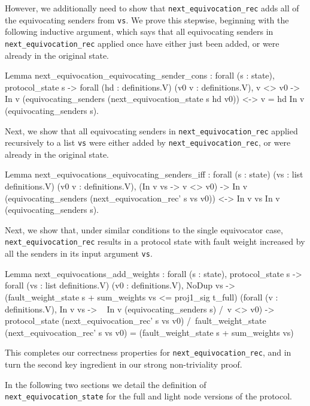 \documentclass[runningheads]{llncs}
\begin{document}
However, we additionally need to show that \verb|next_equivocation_rec| adds all of the equivocating senders from \verb|vs|. We prove this stepwise, beginning with the following inductive argument, which says that all equivocating senders in \verb|next_equivocation_rec| applied once have either just been added, or were already in the original state. 
\begin{coq}
Lemma next_equivocation_equivocating_sender_cons :
	forall (s : state),
	protocol_state s ->
	forall (hd : definitions.V) (v0 v : definitions.V),
	v <> v0 -> 
	In v (equivocating_senders (next_equivocation_state s hd v0)) <->
	v = hd \/ In v (equivocating_senders s).
\end{coq}
Next, we show that all equivocating senders in \verb|next_equivocation_rec| applied recursively to a list \verb|vs| were either added by \verb|next_equivocation_rec|, or were already in the original state. 
\begin{coq}
Lemma next_equivocations_equivocating_senders_iff :
	forall (s : state) (vs : list definitions.V) (v0 v : definitions.V),
	(In v vs -> v <> v0) ->
	In v (equivocating_senders (next_equivocation_rec' s vs v0)) <->
	In v vs \/ In v (equivocating_senders s). 
\end{coq}
Next, we show that, under similar conditions to the single equivocator case, \verb|next_equivocation_rec| results in a protocol state with fault weight increased by all the senders in its input argument \verb|vs|. 
\begin{coq}
Lemma next_equivocations_add_weights : 
	forall (s : state),
	protocol_state s ->
	forall (vs : list definitions.V) (v0 : definitions.V),
	NoDup vs -> 
	(fault_weight_state s + sum_weights vs <= proj1_sig t_full)%
	(forall (v : definitions.V),
	In v vs -> ~ In v (equivocating_senders s) /\ v <> v0) ->
	protocol_state (next_equivocation_rec' s vs v0) /\
	fault_weight_state (next_equivocation_rec' s vs v0) =
	(fault_weight_state s + sum_weights vs)%
\end{coq}
This completes our correctness properties for \verb|next_equivocation_rec|, and in turn the second key ingredient in our strong non-triviality proof. 

In the following two sections we detail the definition of \verb|next_equivocation_state| for the full and light node versions of the protocol. 
\end{document}
